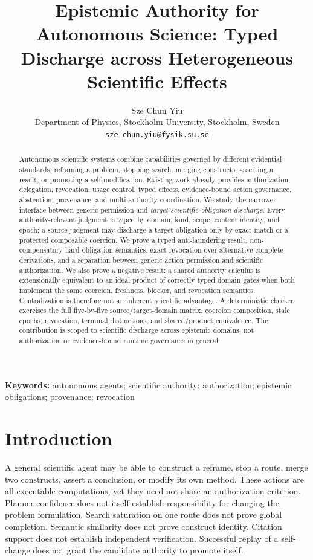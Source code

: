 \documentclass[11pt]{article}
\title{Epistemic Authority for Autonomous Science: Typed Discharge across Heterogeneous Scientific Effects}
\author{Sze Chun Yiu\\Department of Physics, Stockholm University, Stockholm, Sweden\\\texttt{sze-chun.yiu@fysik.su.se}}
\date{}
\begin{document}
\maketitle

\begin{abstract}
Autonomous scientific systems combine capabilities governed by different evidential standards: reframing a problem, stopping search, merging constructs, asserting a result, or promoting a self-modification. Existing work already provides authorization, delegation, revocation, usage control, typed effects, evidence-bound action governance, abstention, provenance, and multi-authority coordination. We study the narrower interface between generic permission and \emph{target scientific-obligation discharge}. Every authority-relevant judgment is typed by domain, kind, scope, content identity, and epoch; a source judgment may discharge a target obligation only by exact match or a protected composable coercion. We prove a typed anti-laundering result, non-compensatory hard-obligation semantics, exact revocation over alternative complete derivations, and a separation between generic action permission and scientific authorization. We also prove a negative result: a shared authority calculus is extensionally equivalent to an ideal product of correctly typed domain gates when both implement the same coercion, freshness, blocker, and revocation semantics. Centralization is therefore not an inherent scientific advantage. A deterministic checker exercises the full five-by-five source/target-domain matrix, coercion composition, stale epochs, revocation, terminal distinctions, and shared/product equivalence. The contribution is scoped to scientific discharge across epistemic domains, not authorization or evidence-bound runtime governance in general.
\end{abstract}

\noindent\textbf{Keywords:} autonomous agents; scientific authority; authorization; epistemic obligations; provenance; revocation

\section{Introduction}
A general scientific agent may be able to construct a reframe, stop a route, merge two constructs, assert a conclusion, or modify its own method. These actions are all executable computations, yet they need not share an authorization criterion. Planner confidence does not itself establish responsibility for changing the problem formulation. Search saturation on one route does not prove global completion. Semantic similarity does not prove construct identity. Citation support does not establish independent verification. Successful replay of a self-change does not grant the candidate authority to promote itself.
\end{document}
